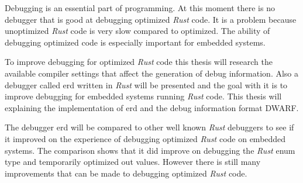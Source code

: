 Debugging is an essential part of programming.
At this moment there is no debugger that is good at debugging optimized \emph{Rust} code.
It is a problem because unoptimized \emph{Rust} code is very slow compared to optimized.
The ability of debugging optimized code is especially important for embedded systems.


To improve debugging for optimized \emph{Rust} code this thesis will research the available compiler settings that affect the generation of debug information.
Also a debugger called \acrshort{erd} written in \emph{Rust} will be presented and the goal with it is to improve debugging for embedded systems running \emph{Rust} code.
This thesis will explaining the implementation of \acrshort{erd} and the debug information format \acrshort{DWARF}.


The debugger \acrshort{erd} will be compared to other well known \emph{Rust} debuggers to see if it improved on the experience of debugging optimized \emph{Rust} code on embedded systems.
The comparison shows that it did improve on debugging the \emph{Rust} enum type and temporarily optimized out values.
However there is still many improvements that can be made to debugging optimized \emph{Rust} code.

